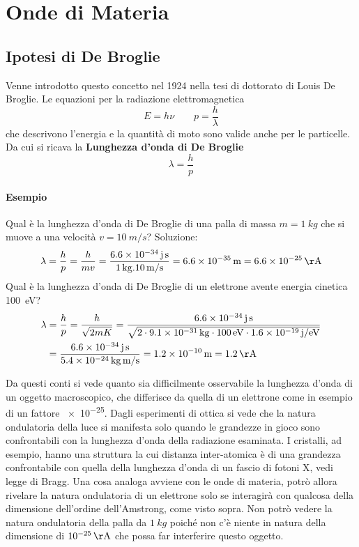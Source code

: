 

\section{Onde di Materia}
\subsection{Ipotesi di De Broglie}
Venne introdotto questo concetto nel 1924 nella tesi di dottorato di Louis De Broglie.
Le equazioni per la radiazione elettromagnetica 
\begin{equation}
E = h\nu \quad \quad p = \frac{ h}{\lambda }
\end{equation}
che descrivono l'energia e la quantità di moto sono valide anche per le particelle.
Da cui si ricava la \textbf{Lunghezza d'onda di De Broglie}
\begin{equation}
\lambda = \frac{ h}{p }
\end{equation}

\paragraph{Esempio}
Qual è la lunghezza d'onda di De Broglie di una palla di massa $ m =\SI{1}{kg}$ che si muove a una velocità $v = \SI{10}{m/s}$?
Soluzione:
\begin{equation}
\lambda = \frac{ h}{p } = \frac{ h}{m v } = \frac{ \SI{6.6e-34}{j.s}}{\SI{1}{kg} . \SI{10}{m/s} } = \SI{6.6e-35}{m} = \SI{6.6e-25}{\AA}
\end{equation}
Qual è la lunghezza d'onda di De Broglie di un elettrone avente energia cinetica \SI{100}{eV}?
\begin{equation}
\begin{split}
\lambda & = \frac{ h}{p } = \frac{ h}{\sqrt{2mK} } 
= \frac{\SI{6.6e-34}{j.s} }{\sqrt{ 2 \cdot \SI{9.1e-31}{kg} \cdot \SI{100}{eV} \cdot \SI{1.6e-19}{j / eV} } } \\
& = \frac{ \SI{6.6e-34}{j.s}}{\SI{5.4e-24}{kg.m/s} } = \SI{1.2e-10}{m} = \SI{1.2}{\AA}
\end{split}
\end{equation}

Da questi conti si vede quanto sia difficilmente osservabile la lunghezza d'onda di un oggetto macroscopico, che differisce da quella di un elettrone come in esempio di un fattore \SI{e-25}{}.
Dagli esperimenti di ottica si vede che la natura ondulatoria della luce si manifesta solo quando le grandezze in gioco sono confrontabili con la lunghezza d'onda della radiazione esaminata.
I cristalli, ad esempio, hanno una struttura la cui distanza inter-atomica è di una grandezza confrontabile con quella della lunghezza d'onda di un fascio di fotoni X, vedi legge di Bragg.
Una cosa analoga avviene con le onde di materia, potrò allora rivelare la natura ondulatoria di un elettrone solo se interagirà con qualcosa della dimensione dell'ordine dell'Amstrong, come visto sopra.
Non potrò vedere la natura ondulatoria della palla da $\SI{1}{kg}$ poiché non c'è niente in natura della dimensione di $\SI{e-25}{\AA}$ che possa far interferire questo oggetto.



